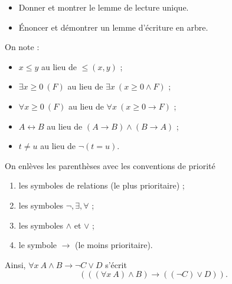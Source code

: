 \documentclass[./main]{subfiles}
\begin{document}
  \begin{exo}
    \begin{itemize}
      \item Donner et montrer le lemme de lecture unique.
      \item Énoncer et démontrer un lemme d'écriture en arbre.
    \end{itemize}
  \end{exo}

  \begin{rmk}
    On note :
    \begin{itemize}
      \item $x \le  y$ au lieu de ${\le}(x,y)$ ;
      \item $\exists x \ge 0\: (F)$ au lieu de $\exists x\: (x \ge 0 \land F)$ ;
      \item $\forall x \ge 0\: (F)$ au lieu de $\forall x\: (x \ge 0 \to F)$ ;
      \item $A \leftrightarrow B$ au lieu de $(A \to B) \land (B \to A)$ ;
      \item $t \neq u$ au lieu de $\lnot (t = u)$.
    \end{itemize}

    On enlèves les parenthèses avec les conventions de priorité 
    \begin{enumerate}
      \item[0.] les symboles de relations (le plus prioritaire) ;
      \item les symboles $\lnot, \exists, \forall$ ;
      \item les symboles $\land$ et $\lor$ ;
      \item le symbole $\to$ (le moins prioritaire).
    \end{enumerate}
  \end{rmk}

  \begin{exm}
    Ainsi, $\forall x \: A \land B \to \lnot C \lor D$ s'écrit \[
      (((\forall x\:A) \land B) \to ((\lnot C) \lor D))
    .\]
  \end{exm}
\end{document}
